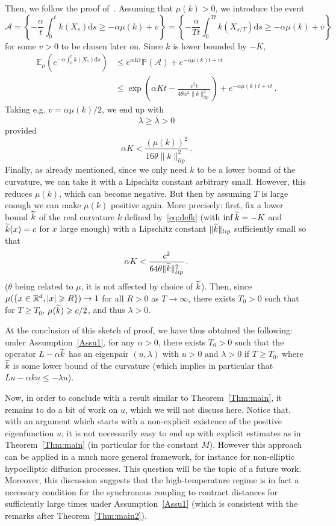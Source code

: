 \documentclass[AHL,Unicode,longabstracts,published]{cedram}
\newcommand{\R}{\mathbb R}
\newcommand{\bbP}{\mathbb P}
\newcommand{\bbE}{\mathbb E}
\newcommand{\A}{\mathcal A}
\newcommand{\dd}{\mathrm{d}}
\newcommand{\1}{\mathbbm{1}}
\let\oldtilde\tilde
\renewcommand*{\tilde}[1]{\mathchoice{\widetilde{#1}}{\widetilde{#1}}{\oldtilde{#1}}{\oldtilde{#1}}}
\newcommand{\R}{\mathbb R}
\begin{document}
Then, we follow the proof of~\cite[Corollary~4.4]{CattiauxGuillinFathi}. Assuming that $\mu(k)>0$, we introduce the event
\[
\A = \left\{ - \frac\alpha{t} \int_0^t k(X_{s})\dd s \geqslant - \alpha \mu(k) + v \right\} = \left\{ - \frac\alpha{Tt} \int_0^{Tt} k(X_{s/T})\dd s \geqslant - \alpha \mu(k) + v \right\}
\]
for some $v>0$ to be chosen later on. Since $k$ is lower bounded by $-K$,
\begin{align*}
\bbE_{\mu} \left( e^{- \alpha \int_0^t k(X_{s})\dd s} \right) & \leqslant e^{\alpha Kt} \bbP(\A) + e^{ - \alpha \mu(k) t + v t} \\
& \leqslant \exp\left( \alpha K t - \frac{v^2 t}{4\theta \alpha^2 \|k\|_{lip}^2}\right) + e^{ - \alpha \mu(k) t + v t}\,.
\end{align*}
Taking e.g. $v = \alpha \mu(k)/2$, we end up with
\[
\lambda \geqslant \bar \lambda >0
\]
provided
\[
\alpha K < \frac{ \left( \mu(k)\right)^2 }{16\theta \|k\|_{lip}^2}\,.
\]
Finally, as already mentioned, since we only need $k$ to be a lower bound of the curvature, we can take it with a Lipschitz constant arbitrary small. However, this reduces $\mu(k)$, which can become negative. But then by assuming $T$ is large enough we can make $\mu(k)$ positive again. More precisely: first, fix a lower bound $\tilde k$ of the real curvature $k$ defined by~\eqref{eq:defk} (with $\inf \tilde k = -K$ and $\tilde k(x) = c$ for $x$ large enough) with a Lipschitz constant $\|\tilde k\|_{lip}$ sufficiently small so that
\[
\alpha K < \frac{ c^2 }{64\theta \|\tilde k\|_{lip}^2}\,.
\]
($\theta$ being related to $\mu$, it is not affected by choice of $\tilde k$). Then, since $\mu(\{x\in \R^d, |x|\linebreak \geqslant R\}) \rightarrow 1$ for all $R>0$ as $T\rightarrow \infty$, there exists $T_0>0$ such that for $T\geqslant T_0$, $\mu(\tilde k) \geqslant c/2$, and thus $\lambda>0$.

At the conclusion of this sketch of proof, we have thus obtained the following: under Assumption~\ref{Assu1}, for any $\alpha>0$, there exists $T_0>0$ such that the operator $L - \alpha \tilde k$ has an eigenpair $(u,\lambda)$ with $u>0$ and $\lambda>0$ if $T\geqslant T_0$, where $\tilde k$ is some lower bound of the curvature (which implies in particular that $Lu - \alpha k u \leqslant -\lambda u$).

Now, in order to conclude with a result similar to Theorem~\ref{Thm:main}, it remains to do a bit of work on $u$, which we will not discuss here. Notice that, with an argument which starts with a non-explicit existence of the positive eigenfunction $u$, it is not necessarily easy to end up with explicit estimates as in Theorem~\ref{Thm:main} (in particular for the constant $M$). However this approach can be applied in a much more general framework, for instance for non-elliptic hypoelliptic diffusion processes. This question will be the topic of a future work. Moreover, this discussion suggests that the high-temperature regime is in fact a necessary condition for the synchronous coupling to contract distances for sufficiently large times under Assumption~\ref{Assu1} (which is consistent with the remarks after Theorem~\ref{Thm:main2}). 




\end{document}
